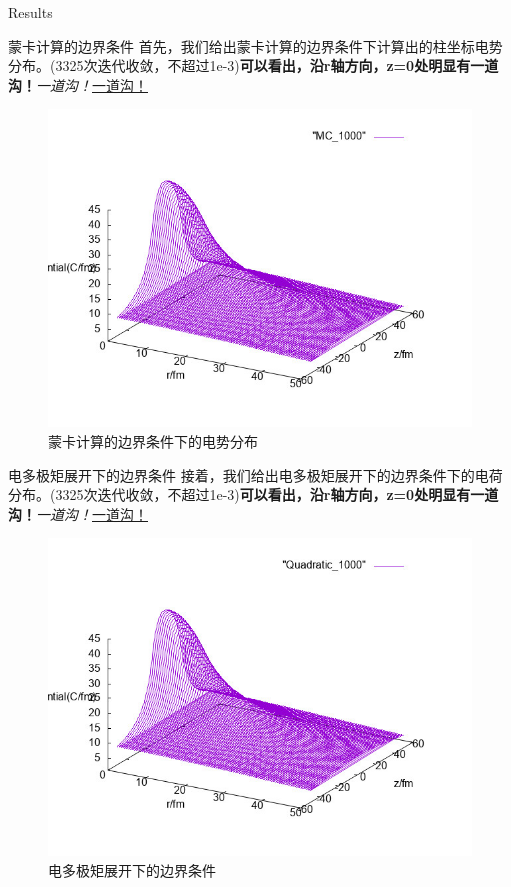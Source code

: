 \documentclass[letterpaper,12pt]{article}
\begin{document}
\begin{section}{Results}
	\begin{subsection}{蒙卡计算的边界条件}
		首先，我们给出蒙卡计算的边界条件下计算出的柱坐标电势分布。(3325次迭代收敛，不超过1e-3)\textbf{可以看出，沿r轴方向，z=0处明显有一道沟！}\emph{一道沟！}\underline{一道沟！}
	 \begin{figure}[!htbp]
		\begin{center}
			\includegraphics[scale=.6]{MC_1000.jpg}
		\end{center}
		\label{p1}
		\caption{蒙卡计算的边界条件下的电势分布}
	 \end{figure}
     \end{subsection}

     \begin{subsection}{电多极矩展开下的边界条件}
        接着，我们给出电多极矩展开下的边界条件下的电荷分布。(3325次迭代收敛，不超过1e-3)\textbf{可以看出，沿r轴方向，z=0处明显有一道沟！}\emph{一道沟！}\underline{一道沟！}
        \begin{figure}[!htbp]
        \begin{center}
            \includegraphics[scale=.6]{Quadratic_1000.jpg}
        \end{center}
        \label{p1}
        \caption{电多极矩展开下的边界条件}
     \end{figure}
     \end{subsection}


\end{section}
\end{document}
